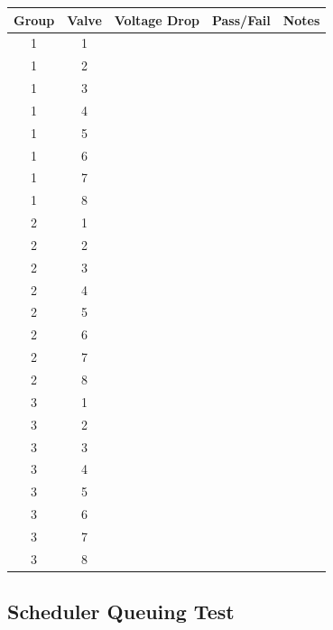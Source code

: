\documentclass{article}
\begin{document}
\begin{enumerate}
	\begin{tabular}{|c|c|c|c|c|}
		\hline
		Group & Valve & Voltage Drop & Pass/Fail & Notes \\
		\hline
		1 & 1 &  && \hspace{20em} \\
		\hline
		1 & 2 &  && \\
		\hline
		1 & 3 &  && \\
		\hline
		1 & 4 &  && \\
		\hline
		1 & 5 &  && \\
		\hline
		1 & 6 &  && \\
		\hline
		1 & 7 &  && \\
		\hline
		1 & 8 &  && \\
		\hline
		\hline
		2 & 1 &  && \\
		\hline
		2 & 2 &  && \\
		\hline
		2 & 3 &  && \\
		\hline
		2 & 4 &  && \\
		\hline
		2 & 5 &  && \\
		\hline
		2 & 6 &  && \\
		\hline
		2 & 7 &  && \\
		\hline
		2 & 8 &  && \\
		\hline
		\hline
		3 & 1 &  && \\
		\hline
		3 & 2 &  && \\
		\hline
		3 & 3 &  && \\
		\hline
		3 & 4 &  && \\
		\hline
		3 & 5 &  && \\
		\hline
		3 & 6 &  && \\
		\hline
		3 & 7 &  && \\
		\hline
		3 & 8 &  && \\
		\hline
	\end{tabular}

\end{enumerate}

\clearpage
\subsection{Scheduler Queuing Test}
\end{document}
